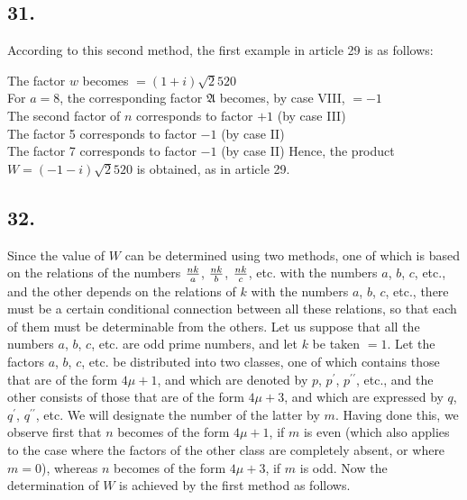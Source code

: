 \documentclass[twoside,12pt, showframe]{memoir}
\renewenvironment{quote}%
  {\list{}{\leftmargin=5em\rightmargin=0em}\item[]}%
  {\endlist}
\let\oldfrac\frac
\def\frac#1#2{\mathchoice{\tfrac{#1}{#2}}{\oldfrac{#1}{#2}}{\genfrac{}{}{}{2}{#1}{#2\mathstrut}}{\genfrac{}{}{}{3}{#1}{#2\mathstrut}}}
\begin{document}
\subsection*{31.}

According to this second method, the first example in article 29 is as follows:
\begin{quote}The factor \(w\) becomes \(=(1+i) \surd 2520\)\\
For \(a=8\), the corresponding factor \(\mathfrak{A}\) becomes, by case VIII, \(=-1\)\\
The second factor of \(n\) corresponds to factor \(+1\) (by case III)\\
The factor 5 corresponds to factor \(-1\) (by case II)\\
The factor 7 corresponds to factor \(-1\) (by case II)\end{quote}
Hence, the product \(W=(-1-i) \surd 2520\) is obtained, as in article 29.
%

\subsection*{32.}

Since the value of \(W\) can be determined using two methods, one of which is based on the relations of the numbers \(\frac{n k}{a}\), \(\frac{n k}{b}\), \(\frac{n k}{c}\), etc. with the numbers \(a\), \(b\), \(c\), etc., and the other depends on the relations of \(k\) with the numbers \(a\), \(b\), \(c\), etc., there must be a certain conditional connection between all these relations, so that each of them must be determinable from the others. Let us suppose that all the numbers \(a\), \(b\), \(c\), etc. are odd prime numbers, and let \(k\) be taken \(=1\). Let the factors \(a\), \(b\), \(c\), etc. be distributed into two classes, one of which contains those that are of the form \(4\mu+1\), and which are denoted by \(p\), \(p^{\prime}\), \(p^{\prime\prime}\), etc., and the other consists of those that are of the form \(4\mu+3\), and which are expressed by \(q\), \(q^{\prime}\), \(q^{\prime\prime}\), etc. We will designate the number of the latter by \(m\). Having done this, we observe first that \(n\) becomes of the form \(4\mu+1\), if \(m\) is even (which also applies to the case where the factors of the other class are completely absent, or where \(m=0\)), whereas \(n\) becomes of the form \(4\mu+3\), if \(m\) is odd. Now the determination of \(W\) is achieved by the first method as follows.
\end{document}

